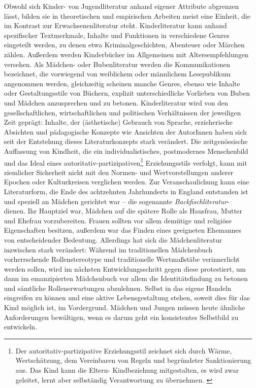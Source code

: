 Obwohl sich Kinder- von Jugendliteratur anhand eigener Attribute abgrenzen lässt, bilden sie in theoretischen und empirischen Arbeiten meist eine Einheit, die im Kontrast zur Erwachsenenliteratur steht. Kinderliteratur kann anhand spezifischer Textmerkmale, Inhalte und Funktionen in verschiedene Genres  eingeteilt werden, zu denen etwa Kriminalgeschichten, Abenteuer oder Märchen zählen.  Außerdem werden Kinderbücher  im Allgemeinen mit Altersempfehlungen versehen.\parencite[10]{Ewers2011}
Als Mädchen- oder Bubenliteratur werden die Kommunikationen bezeichnet, die vorwiegend von  weiblichem oder männlichem Lesepublikum angenommen werden, gleichzeitig  scheinen manche Genres, ebenso wie Inhalte oder Gestaltungsstile von Büchern, explizit unterschiedliche Vorlieben von Buben und Mädchen anzusprechen und zu betonen.
Kinderliteratur wird von den gesellschaftlichen, wirtschaftlichen und politischen Verhältnissen der jeweiligen Zeit geprägt: Inhalte, der (ästhetische) Gebrauch von Sprache, erzieherische Absichten und pädagogische Konzepte wie Ansichten der AutorInnen haben sich seit der Entstehung dieses Literaturkonzepts stark verändert.  Die zeitgenössische Auffassung von Kindheit, die ein individualistisches, postmodernes Menschenbild und das Ideal eines autoritativ-partizipativen\footnote{Der autoritativ-partizipative Erziehungsstil  zeichnet sich durch Wärme, Wertschätzung, dem Vereinbaren von Regeln und begründeter Sanktionierung aus. Das Kind kann die Eltern- Kindbeziehung mitgestalten, es wird zwar geleitet, lernt aber selbständig Verantwortung zu übernehmen. \parencite[35]{Kuttler2009}} Erziehungsstils verfolgt, kann mit ziemlicher Sicherheit nicht mit den Normen- und Wertvorstellungen anderer Epochen oder Kulturkreisen verglichen werden. 
Zur Veranschaulichung kann eine Literaturform, die Ende des achtzehnten Jahrhunderts in England entstanden ist und speziell an Mädchen gerichtet war – die sogenannte  \emph{Backfischliteratur}- dienen. Ihr Hauptziel war, Mädchen auf die spätere Rolle als Hausfrau, Mutter und Ehefrau vorzubereiten. Frauen sollten vor allem demütige und religiöse Eigenschaften besitzen, außerdem war das Finden eines geeigneten Ehemannes von entscheidender Bedeutung. Allerdings hat sich die Mädchenliteratur inzwischen stark verändert: Während im traditionellen Mädchenbuch vorherrschende Rollenstereotype und traditionelle Wertmaßstäbe verinnerlicht werden sollen, wird im nächsten Entwicklungsschritt gegen diese protestiert, um dann im emanzipierten Mädchenbuch vor allem die Identitätsfindung zu betonen und sämtliche Rollenerwartungen abzulehnen. Selbst in das eigene Handeln eingreifen zu können und eine aktive Lebensgestaltung stehen, soweit dies für das Kind möglich ist, im Vordergrund. Mädchen und Jungen müssen heute ähnliche Anforderungen bewältigen, wenn es darum geht ein konsistentes Selbstbild zu entwickeln. 


